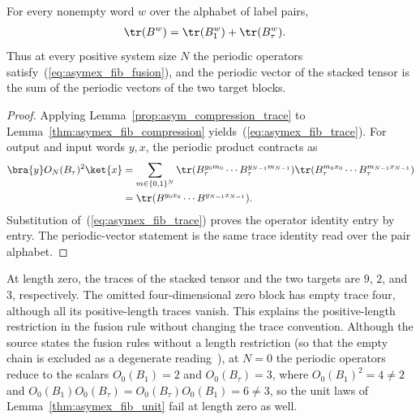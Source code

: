 \begin{lemma}
    \label{thm:asymex_fib_fusion}
    \leanok
    For every nonempty word $w$ over the alphabet of label pairs,
    \begin{align}
        \tr(B^w) & =\tr(B_1^w)+\tr(B_\tau^w).
        \label{eq:asymex_fib_trace}
    \end{align}
    Thus at every positive system size $N$ the periodic operators
    satisfy~(\ref{eq:asymex_fib_fusion}), and the periodic vector
    of the stacked tensor is the sum of the periodic vectors of
    the two target blocks.
\end{lemma}

\begin{proof}
    \leanok
    Applying Lemma~\ref{prop:asym_compression_trace} to
    Lemma~\ref{thm:asymex_fib_compression}
    yields~(\ref{eq:asymex_fib_trace}).
    For output and input words $y,x$, the periodic product contracts
    as
    \begin{align}
        \bra{y}O_N(B_\tau)^2\ket{x}
         & =\sum_{m\in\{0,1\}^N}
        \tr(B_\tau^{y_0m_0}\cdots B_\tau^{y_{N-1}m_{N-1}})
        \tr(B_\tau^{m_0x_0}\cdots B_\tau^{m_{N-1}x_{N-1}})
        \nonumber                                     \\
         & =\tr(B^{y_0x_0}\cdots B^{y_{N-1}x_{N-1}}).
    \end{align}
    Substitution of~(\ref{eq:asymex_fib_trace}) proves the operator
    identity entry by entry. The periodic-vector statement is the
    same trace identity read over the pair alphabet.
\end{proof}

At length zero, the traces of the stacked tensor and the two targets
are $9$, $2$, and $3$, respectively. The omitted four-dimensional
zero block has empty trace four, although all its positive-length
traces vanish. This explains the positive-length restriction in the
fusion rule without changing the trace convention. Although the source
states the fusion rules without a length restriction (so that the empty
chain is excluded as a degenerate
reading~\cite{gap:bmwshv17_fibonacci_projector_positive_length}), at
$N=0$ the periodic operators reduce to the scalars $O_0(B_1)=2$ and
$O_0(B_\tau)=3$, where $O_0(B_1)^2=4\neq2$ and
$O_0(B_1)O_0(B_\tau)=O_0(B_\tau)O_0(B_1)=6\neq3$, so the unit laws of
Lemma~\ref{thm:asymex_fib_unit} fail at length zero as well.

